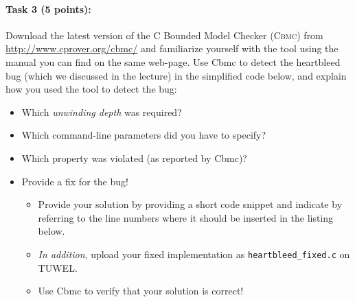 \documentclass[11pt,a4paper]{article}
\begin{document}
\paragraph{Task 3 (5 points):}
Download the latest version of the
C Bounded Model Checker (\textsc{Cbmc}) from
\url{http://www.cprover.org/cbmc/} and familiarize
yourself with the tool using the manual you can find on the
same web-page. Use {\sc Cbmc} to detect the heartbleed
bug (which we discussed in the lecture) in the simplified code below,
and explain how you used the tool to detect the bug:
\begin{itemize}
\item Which \emph{unwinding depth} was required?
\item Which command-line parameters did you have to specify?
\item Which property was violated (as reported by {\sc Cbmc})?
\item Provide a fix for the bug!
  \begin{itemize}
    \item Provide your solution by
      providing a short code snippet and indicate by referring to the
      line numbers where it should be inserted in the listing below.
    \item \emph{In addition}, upload your fixed implementation as
      {\tt heartbleed\_fixed.c} on TUWEL.
    \item Use {\sc Cbmc} to verify that your solution is correct!
    \end{itemize}
\end{itemize}
\end{document}
